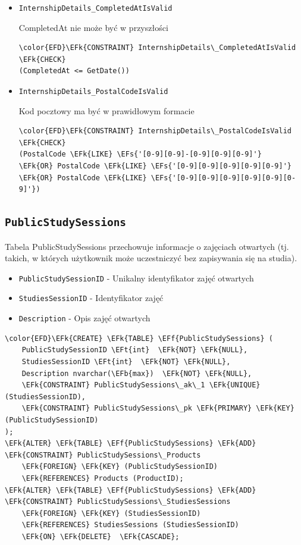 \documentclass[11pt]{article}
\newcommand{\EFs}[1]{\textcolor{EFs}{#1}} %
\newcommand{\EFk}[1]{\textcolor{EFk}{\textbf{#1}}} %
\newcommand{\EFb}[1]{\textcolor{EFb}{\textbf{#1}}} %
\newcommand{\EFf}[1]{\textcolor{EFf}{#1}} %
\newcommand{\EFt}[1]{\textcolor{EFt}{\textbf{#1}}} %
\begin{document}
\begin{itemize}
\item \texttt{InternshipDetails\_CompletedAtIsValid}

CompletedAt nie może być w przyszłości
\begin{Code}
\begin{Verbatim}
\color{EFD}\EFk{CONSTRAINT} InternshipDetails\_CompletedAtIsValid \EFk{CHECK}
(CompletedAt <= GetDate())
\end{Verbatim}
\end{Code}
\item \texttt{InternshipDetails\_PostalCodeIsValid}

Kod pocztowy ma być w prawidłowym formacie
\begin{Code}
\begin{Verbatim}
\color{EFD}\EFk{CONSTRAINT} InternshipDetails\_PostalCodeIsValid \EFk{CHECK}
(PostalCode \EFk{LIKE} \EFs{'[0-9][0-9]-[0-9][0-9][0-9]'}
\EFk{OR} PostalCode \EFk{LIKE} \EFs{'[0-9][0-9][0-9][0-9][0-9]'}
\EFk{OR} PostalCode \EFk{LIKE} \EFs{'[0-9][0-9][0-9][0-9][0-9][0-9]'})
\end{Verbatim}
\end{Code}
\end{itemize}
\subsection{\texttt{PublicStudySessions}}
\label{sec:orgd54acd4}
Tabela PublicStudySessions przechowuje informacje o zajęciach otwartych  (tj. takich, w których użytkownik może uczestniczyć bez zapisywania się na studia).
\begin{itemize}
\item \texttt{PublicStudySessionID} - Unikalny identyfikator zajęć otwartych
\item \texttt{StudiesSessionID} - Identyfikator zajęć
\item \texttt{Description} - Opis zajęć otwartych
\end{itemize}
\begin{Code}
\begin{Verbatim}
\color{EFD}\EFk{CREATE} \EFk{TABLE} \EFf{PublicStudySessions} (
    PublicStudySessionID \EFt{int}  \EFk{NOT} \EFk{NULL},
    StudiesSessionID \EFt{int}  \EFk{NOT} \EFk{NULL},
    Description nvarchar(\EFb{max})  \EFk{NOT} \EFk{NULL},
    \EFk{CONSTRAINT} PublicStudySessions\_ak\_1 \EFk{UNIQUE} (StudiesSessionID),
    \EFk{CONSTRAINT} PublicStudySessions\_pk \EFk{PRIMARY} \EFk{KEY}  (PublicStudySessionID)
);
\EFk{ALTER} \EFk{TABLE} \EFf{PublicStudySessions} \EFk{ADD} \EFk{CONSTRAINT} PublicStudySessions\_Products
    \EFk{FOREIGN} \EFk{KEY} (PublicStudySessionID)
    \EFk{REFERENCES} Products (ProductID);
\EFk{ALTER} \EFk{TABLE} \EFf{PublicStudySessions} \EFk{ADD} \EFk{CONSTRAINT} PublicStudySessions\_StudiesSessions
    \EFk{FOREIGN} \EFk{KEY} (StudiesSessionID)
    \EFk{REFERENCES} StudiesSessions (StudiesSessionID)
    \EFk{ON} \EFk{DELETE}  \EFk{CASCADE};
\end{Verbatim}
\end{Code}
\end{document}
